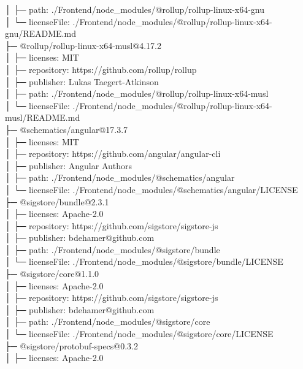 \documentclass[
    paper=a4,
    twoside=false,
    parskip=half,
    listof=entryprefix,
    listof=totoc,
    index=totoc,
    bibliography=totoc,
    headsepline,
]{scrbook}
\begin{document}
    │  ├─ path: ./Frontend/node\_modules/@rollup/rollup-linux-x64-gnu\\
    │  └─ licenseFile: ./Frontend/node\_modules/@rollup/rollup-linux-x64-gnu/README.md\\
    ├─ @rollup/rollup-linux-x64-musl@4.17.2\\
    │  ├─ licenses: MIT\\
    │  ├─ repository: https://github.com/rollup/rollup\\
    │  ├─ publisher: Lukas Taegert-Atkinson\\
    │  ├─ path: ./Frontend/node\_modules/@rollup/rollup-linux-x64-musl\\
    │  └─ licenseFile: ./Frontend/node\_modules/@rollup/rollup-linux-x64-musl/README.md\\
    ├─ @schematics/angular@17.3.7\\
    │  ├─ licenses: MIT\\
    │  ├─ repository: https://github.com/angular/angular-cli\\
    │  ├─ publisher: Angular Authors\\
    │  ├─ path: ./Frontend/node\_modules/@schematics/angular\\
    │  └─ licenseFile: ./Frontend/node\_modules/@schematics/angular/LICENSE\\
    ├─ @sigstore/bundle@2.3.1\\
    │  ├─ licenses: Apache-2.0\\
    │  ├─ repository: https://github.com/sigstore/sigstore-js\\
    │  ├─ publisher: bdehamer@github.com\\
    │  ├─ path: ./Frontend/node\_modules/@sigstore/bundle\\
    │  └─ licenseFile: ./Frontend/node\_modules/@sigstore/bundle/LICENSE\\
    ├─ @sigstore/core@1.1.0\\
    │  ├─ licenses: Apache-2.0\\
    │  ├─ repository: https://github.com/sigstore/sigstore-js\\
    │  ├─ publisher: bdehamer@github.com\\
    │  ├─ path: ./Frontend/node\_modules/@sigstore/core\\
    │  └─ licenseFile: ./Frontend/node\_modules/@sigstore/core/LICENSE\\
    ├─ @sigstore/protobuf-specs@0.3.2\\
    │  ├─ licenses: Apache-2.0\\
\end{document}

